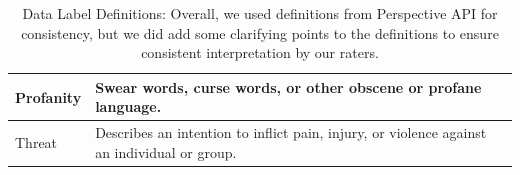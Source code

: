 \documentclass[11pt]{article}
\begin{document}
\begin{table}[h]
\begin{tabular}{ll}
Profanity               & Swear words, curse words, or other obscene or profane language.                                                                                                                                                                                                                                                                    \\ \hline
Threat                  & Describes an intention to inflict pain, injury, or violence against an individual or group.                                                                                                                                                                                                                                        \\ \hline
\end{tabular}
\caption{\label{label-definitions}
Data Label Definitions: Overall, we used definitions from Perspective API for consistency, but we did add some clarifying points to the definitions to ensure consistent interpretation by our raters. }
\end{table}
\end{document}
